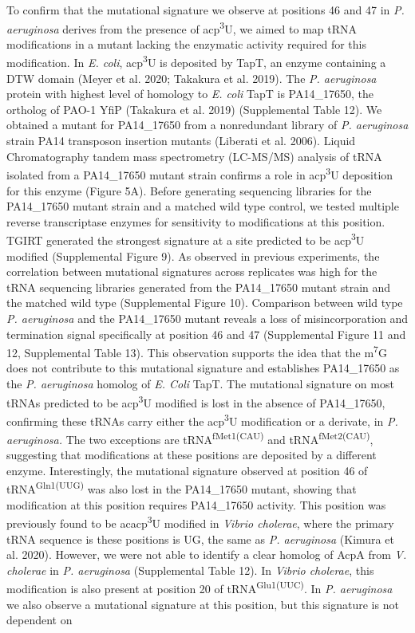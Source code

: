 \documentclass[times, twoside]{zHenriquesLab-StyleBioRxiv}
\begin{document}
\newline
To confirm that the mutational signature we observe at positions 46 and 47 in \textit{P. aeruginosa} derives from the presence of acp\textsuperscript{3}U, we aimed to map tRNA modifications in a mutant lacking the enzymatic activity required for this modification. In \textit{E. coli}, acp\textsuperscript{3}U is deposited by TapT, an enzyme containing a DTW domain (Meyer et al. 2020; Takakura et al. 2019). The \textit{P. aeruginosa} protein with highest level of homology to \textit{E. coli} TapT is PA14\_17650, the ortholog of PAO-1 YfiP (Takakura et al. 2019) (Supplemental Table 12). We obtained a mutant for PA14\_17650 from a nonredundant library of \textit{P. aeruginosa} strain PA14 transposon insertion mutants (Liberati et al. 2006). Liquid Chromatography tandem mass spectrometry (LC-MS/MS) analysis of tRNA isolated from a PA14\_17650 mutant strain confirms a role in acp\textsuperscript{3}U deposition for this enzyme (Figure 5A). Before generating sequencing libraries for the PA14\_17650 mutant strain and a matched wild type control, we tested multiple reverse transcriptase enzymes for sensitivity to modifications at this position. TGIRT generated the strongest signature at a site predicted to be acp\textsuperscript{3}U modified (Supplemental Figure 9). As observed in previous experiments, the correlation between mutational signatures across replicates was high for the tRNA sequencing libraries generated from the PA14\_17650 mutant strain and the matched wild type (Supplemental Figure 10). Comparison between wild type \textit{P. aeruginosa} and the PA14\_17650 mutant reveals a loss of misincorporation and termination signal specifically at position 46 and 47 (Supplemental Figure 11 and 12, Supplemental Table 13). This observation supports the idea that the m\textsuperscript{7}G does not contribute to this mutational signature and establishes PA14\_17650 as the \textit{P. aeruginosa} homolog of \textit{E. Coli} TapT. The mutational signature on most tRNAs predicted to be acp\textsuperscript{3}U modified is lost in the absence of PA14\_17650, confirming these tRNAs carry either the acp\textsuperscript{3}U modification or a derivate, in \textit{P. aeruginosa. }The two exceptions are tRNA\textsuperscript{fMet1(CAU)} and tRNA\textsuperscript{fMet2(CAU)}, suggesting that modifications at these positions are deposited by a different enzyme. Interestingly, the mutational signature observed at position 46 of tRNA\textsuperscript{Gln1(UUG)} was also lost in the PA14\_17650 mutant, showing that modification at this position requires PA14\_17650 activity. This position was previously found to be acacp\textsuperscript{3}U modified in \textit{Vibrio cholerae}, where the primary tRNA sequence is these positions is UG, the same as \textit{P. aeruginosa} (Kimura et al. 2020). However, we were not able to identify a clear homolog of AcpA from \textit{V. cholerae }in\textit{ P. aeruginosa }(Supplemental Table 12). In \textit{Vibrio cholerae}, this modification is also present at position 20 of tRNA\textsuperscript{Gl}\textsuperscript{u}\textsuperscript{1(UU}\textsuperscript{C}\textsuperscript{)}. In \textit{P. aeruginosa} we also observe a mutational signature at this position, but this signature is not dependent on 
\end{document}
